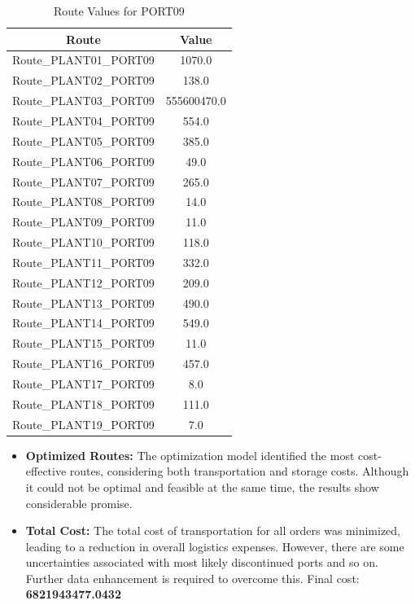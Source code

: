 \documentclass{article}
\begin{document}
\begin{table}[h!]
    \centering
    \begin{tabular}{|c|c|}
        \hline
        \textbf{Route} & \textbf{Value} \\
        \hline
        Route\_PLANT01\_PORT09 & 1070.0 \\
        Route\_PLANT02\_PORT09 & 138.0 \\
        Route\_PLANT03\_PORT09 & 555600470.0 \\
        Route\_PLANT04\_PORT09 & 554.0 \\
        Route\_PLANT05\_PORT09 & 385.0 \\
        Route\_PLANT06\_PORT09 & 49.0 \\
        Route\_PLANT07\_PORT09 & 265.0 \\
        Route\_PLANT08\_PORT09 & 14.0 \\
        Route\_PLANT09\_PORT09 & 11.0 \\
        Route\_PLANT10\_PORT09 & 118.0 \\
        Route\_PLANT11\_PORT09 & 332.0 \\
        Route\_PLANT12\_PORT09 & 209.0 \\
        Route\_PLANT13\_PORT09 & 490.0 \\
        Route\_PLANT14\_PORT09 & 549.0 \\
        Route\_PLANT15\_PORT09 & 11.0 \\
        Route\_PLANT16\_PORT09 & 457.0 \\
        Route\_PLANT17\_PORT09 & 8.0 \\
        Route\_PLANT18\_PORT09 & 111.0 \\
        Route\_PLANT19\_PORT09 & 7.0 \\
        \hline
    \end{tabular}
    \caption{Route Values for PORT09}
\end{table}


\begin{itemize}
    \item \textbf{Optimized Routes:} The optimization model identified the most cost-effective routes, considering both transportation and storage costs. Although it could not be optimal and feasible at the same time, the results show considerable promise. 
    \item \textbf{Total Cost:} The total cost of transportation for all orders was minimized, leading to a reduction in overall logistics expenses. However, there are some uncertainties associated with most likely discontinued ports and so on. Further data enhancement is required to overcome this. Final cost: \textbf{6821943477.0432}
\end{itemize}
\end{document}
